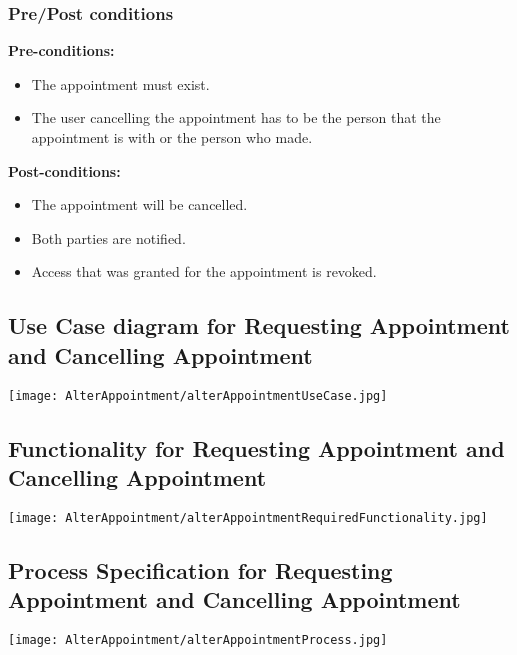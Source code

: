 \subsubsection{Pre/Post conditions}
\textbf{Pre-conditions:} 
	\begin{itemize}
		\item The appointment must exist.
		\item The user cancelling the appointment has to be the person that the appointment is with or the person who made.
	\end{itemize}
\textbf{Post-conditions:} 
	\begin{itemize}
		\item The appointment will be cancelled.
		\item  Both parties are notified.
		\item Access that was granted for the appointment is revoked. 
	\end{itemize}

\subsection{Use Case diagram for Requesting Appointment and Cancelling Appointment}
	\texttt{[image: AlterAppointment/alterAppointmentUseCase.jpg]}
\subsection{Functionality for Requesting Appointment and Cancelling Appointment}
	\texttt{[image: AlterAppointment/alterAppointmentRequiredFunctionality.jpg]}
\subsection{Process Specification for Requesting Appointment and Cancelling Appointment}
	\texttt{[image: AlterAppointment/alterAppointmentProcess.jpg]}

